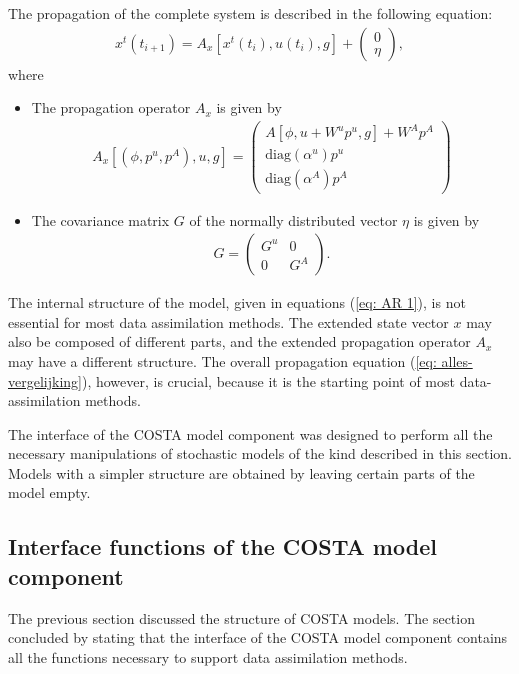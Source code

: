 \documentclass[a4paper,12pt]{article}
\begin{document}
The propagation of the complete system is described in the following
equation:
\begin{eqnarray}
 x^t(t_{i+1}) = A_x[x^t(t_i),u(t_i),g] + \left( \begin{array}{l} 0 \\ \eta
  \label{eq: alles-vergelijking}
\end{array}\right),
\end{eqnarray}
where 
\begin{itemize}
 \item The propagation operator $A_x$ is given by
  \begin{eqnarray}
      A_x[(\phi,p^u,p^A),u,g] = \left(
       \begin{array}{ll}
         A[\phi,u+W^up^u,g] + W^A p^A\\
         \mbox{diag}(\alpha^u)p^u\\
         \mbox{diag}(\alpha^A)p^A
      \end{array} \right)
  \end{eqnarray}
 \item The covariance matrix $G$ of the normally distributed vector $\eta$
       is given by
       \begin{eqnarray}
         G = \left(\begin{array}{ll}
                G^u & 0 \\ 0 & G^A \end{array}
             \right).
       \end{eqnarray}
\end{itemize}
The internal structure of the model, given in equations (\ref{eq: AR 1}), 
is not essential for most data assimilation methods. 
The extended state vector $x$ may also be composed of different parts, and 
the extended propagation operator $A_x$ may have a different structure.
The overall
propagation equation (\ref{eq: alles-vergelijking}), however, is crucial,
because it is the starting point of most data-assimilation methods.

The interface of the COSTA model component was designed to perform all the
necessary manipulations of stochastic models of the kind described in this
section.  Models with a simpler structure are obtained by leaving certain
parts of the model empty. 



\subsection{Interface functions of the COSTA model component}
\label{Sec: model interface}
The previous section discussed the structure of COSTA models. The section
concluded by stating that the interface of the COSTA model component 
contains all the functions necessary to support data assimilation methods.
\end{document}
